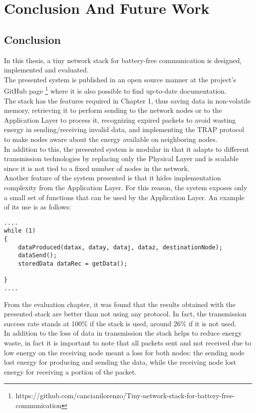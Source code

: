 \chapter{Conclusion And Future Work}
\label{cha:conclusion}
\section{Conclusion}
In this thesis, a tiny network stack for battery-free communication is designed, implemented and evaluated.\\
The presented system is published in an open source manner at the project's GitHub page \footnote{https://github.com/cancianilorenzo/Tiny-network-stack-for-battery-free-communication} where it is also possible to find up-to-date documentation.\\
The stack has the features required in Chapter 1, thus saving data in non-volatile memory, retrieving it to perform sending to the network nodes or to the Application Layer to process it, recognizing expired packets to avoid wasting energy in sending/receiving invalid data, and implementing the TRAP protocol to make nodes aware about the energy available on neighboring nodes.\\
In addition to this, the presented system is modular in that it adapts to different transmission technologies by replacing only the Physical Layer and is scalable since it is not tied to a fixed number of nodes in the network.\\
Another feature of the system presented is that it hides implementation complexity from the Application Layer. For this reason, the system exposes only a small set of functions that can be used by the Application Layer. An example of its use is as follows:\\
\begin{lstlisting}
....
while (1)
{
    dataProduced(datax, datay, dataj, dataz, destinationNode);
    dataSend();
    storedData dataRec = getData();

}
....
\end{lstlisting}
From the evaluation chapter, it was found that the results obtained with the presented stack are better than not using any protocol. In fact, the transmission success rate stands at 100\% if the stack is used, around 26\% if it is not used.\\
In addition to the loss of data in transmission the stack helps to reduce energy waste, in fact it is important to note that all packets sent and not received due to low energy on the receiving node meant a loss for both nodes: the sending node lost energy for producing and sending the data, while the receiving node lost energy for receiving a portion of the packet.

